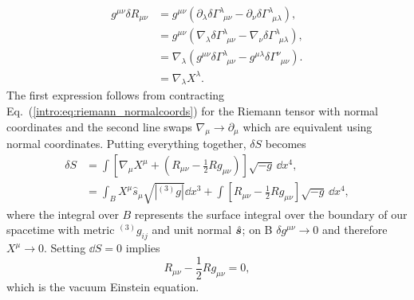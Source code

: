 \begin{align}
g^{\mu\nu} \delta R_{\mu\nu} &= g^{\mu\nu}\left( \partial_\lambda \delta\Gamma^{\lambda}_{\,\,\,\mu\nu} - \partial_\nu \delta\Gamma^{\lambda}_{\,\,\,\mu\lambda} \right), \\
&= g^{\mu\nu}\left( \nabla_\lambda \delta\Gamma^{\lambda}_{\,\,\,\mu\nu} - \nabla_\nu \delta\Gamma^{\lambda}_{\,\,\,\mu\lambda} \right), \\
&= \nabla_\lambda \left( g^{\mu\nu} \delta\Gamma^{\lambda}_{\,\,\,\mu\nu} - g^{\mu\lambda} \delta\Gamma^{\nu}_{\,\,\,\mu\nu} \right). \\
&=\nabla_\lambda X^\lambda.
\end{align}
The first expression follows from contracting Eq.~(\ref{intro:eq:riemann_normalcoords}) for the Riemann tensor with normal coordinates and the second line swaps $\nabla_\mu \rightarrow \partial_\mu$ which are equivalent using normal coordinates. Putting everything together, $\delta S$ becomes
\begin{align}
\delta S &= \int \left[ \nabla_\mu X^\mu + \left( R_{\mu\nu}-\frac{1}{2}Rg_{\mu\nu}\right)\right]\sqrt{-g}\,\dd x^4, \\
&= \int_B X^\mu \hat{s}_\mu \sqrt{|{}^{(3)}g|}\dd x^3 + \int \left[  R_{\mu\nu}-\frac{1}{2}Rg_{\mu\nu}\right]\sqrt{-g}\,\dd x^4, 
\end{align}
where the integral over $B$ represents the surface integral over the boundary of our spacetime with metric ${}^{(3)}g_{ij}$ and unit normal $\hat{\boldsymbol{s}}$; on B $\delta g^{\mu\nu}\rightarrow 0 $ and therefore $X^\mu \rightarrow 0$. Setting $\dd S =0$ implies
\begin{equation}
R_{\mu\nu}-\frac{1}{2}Rg_{\mu\nu}=0,
\end{equation} 
which is the vacuum Einstein equation.

